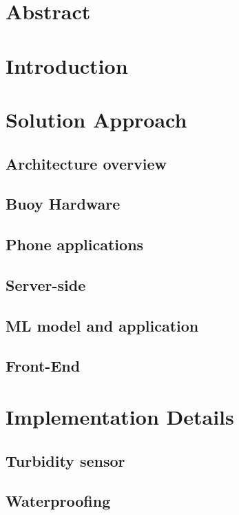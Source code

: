 \documentclass{article}
\begin{document}
\section{Abstract}

\section{Introduction}

\section{Solution Approach}

\subsection{Architecture overview}

\subsection{Buoy Hardware}

\subsection{Phone applications}

\subsection{Server-side}

\subsection{ML model and application}

\subsection{Front-End}

\section{Implementation Details}

\subsection{Turbidity sensor}

\subsection{Waterproofing}
\end{document}
